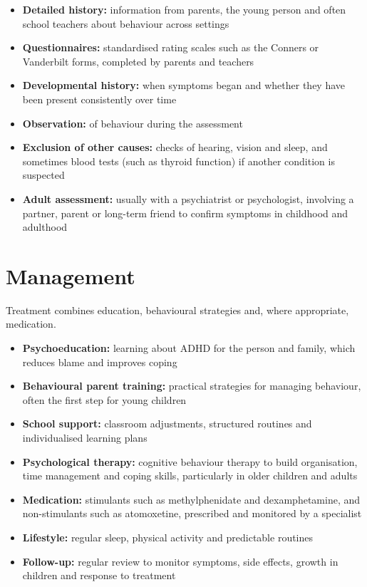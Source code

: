 \begin{itemize}
    \item \textbf{Detailed history:} information from parents, the young person and often school teachers about behaviour across settings
    \item \textbf{Questionnaires:} standardised rating scales such as the Conners or Vanderbilt forms, completed by parents and teachers
    \item \textbf{Developmental history:} when symptoms began and whether they have been present consistently over time
    \item \textbf{Observation:} of behaviour during the assessment
    \item \textbf{Exclusion of other causes:} checks of hearing, vision and sleep, and sometimes blood tests (such as thyroid function) if another condition is suspected
    \item \textbf{Adult assessment:} usually with a psychiatrist or psychologist, involving a partner, parent or long-term friend to confirm symptoms in childhood and adulthood
\end{itemize}

\section*{Management}
Treatment combines education, behavioural strategies and, where appropriate, medication.

\begin{itemize}
    \item \textbf{Psychoeducation:} learning about ADHD for the person and family, which reduces blame and improves coping
    \item \textbf{Behavioural parent training:} practical strategies for managing behaviour, often the first step for young children
    \item \textbf{School support:} classroom adjustments, structured routines and individualised learning plans
    \item \textbf{Psychological therapy:} cognitive behaviour therapy to build organisation, time management and coping skills, particularly in older children and adults
    \item \textbf{Medication:} stimulants such as methylphenidate and dexamphetamine, and non-stimulants such as atomoxetine, prescribed and monitored by a specialist
    \item \textbf{Lifestyle:} regular sleep, physical activity and predictable routines
    \item \textbf{Follow-up:} regular review to monitor symptoms, side effects, growth in children and response to treatment
\end{itemize}


